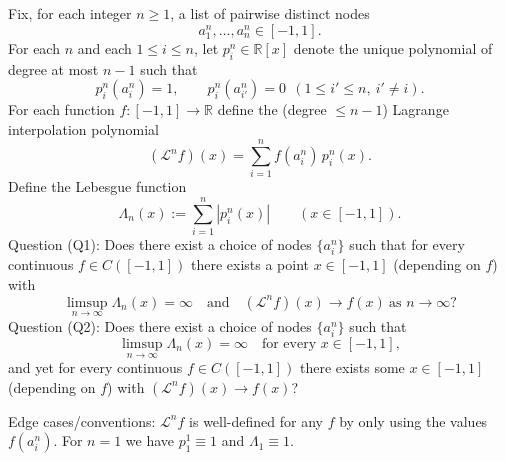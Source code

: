 Fix, for each integer $n\ge 1$, a list of pairwise distinct nodes
\[
 a_1^n,\dots,a_n^n\in[-1,1].
\]
For each $n$ and each $1\le i\le n$, let $p_i^n\in\mathbb R[x]$ denote the unique polynomial of degree at most $n-1$ such that
\[
 p_i^n(a_i^n)=1,\qquad p_i^n(a_{i'}^n)=0\ \ (1\le i'\le n,\ i'\ne i).
\]
For each function $f:[-1,1]\to\mathbb R$ define the (degree $\le n-1$) Lagrange interpolation polynomial
\[
 (\mathcal L^n f)(x)=\sum_{i=1}^n f(a_i^n)\,p_i^n(x).
\]
Define the Lebesgue function
\[
 \Lambda_n(x):=\sum_{i=1}^n |p_i^n(x)|\qquad(x\in[-1,1]).
\]
Question (Q1): Does there exist a choice of nodes $\{a_i^n\}$ such that for every continuous $f\in C([-1,1])$ there exists a point $x\in[-1,1]$ (depending on $f$) with
\[
 \limsup_{n\to\infty} \Lambda_n(x)=\infty\quad\text{and}\quad (\mathcal L^n f)(x)\to f(x)\ \text{as }n\to\infty?
\]
Question (Q2): Does there exist a choice of nodes $\{a_i^n\}$ such that
\[
 \limsup_{n\to\infty}\Lambda_n(x)=\infty\quad\text{for every }x\in[-1,1],
\]
and yet for every continuous $f\in C([-1,1])$ there exists some $x\in[-1,1]$ (depending on $f$) with $(\mathcal L^n f)(x)\to f(x)$?

Edge cases/conventions: $\mathcal L^n f$ is well-defined for any $f$ by only using the values $f(a_i^n)$. For $n=1$ we have $p_1^1\equiv 1$ and $\Lambda_1\equiv 1$.
